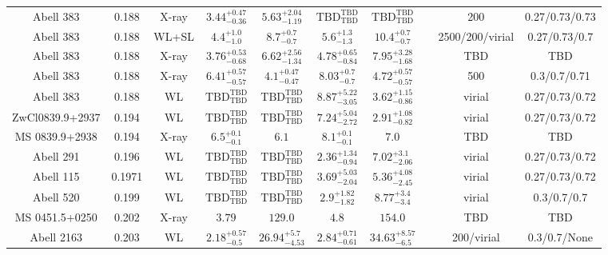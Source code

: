 \begin{table}
\begin{tabular}{cccccccccc}
Abell 383 & 0.188 & X-ray & ${3.44}^{+0.47}_{-0.36}$ & ${5.63}^{+2.04}_{-1.19}$ & ${\mathrm{TBD}}^{\mathrm{TBD}}_{\mathrm{TBD}}$ & ${\mathrm{TBD}}^{\mathrm{TBD}}_{\mathrm{TBD}}$ & \citet{BA14.1} & 200 & 0.27/0.73/0.73 \\
Abell 383 & 0.188 & WL+SL & ${4.4}^{+1.0}_{-1.0}$ & ${8.7}^{+0.7}_{-0.7}$ & ${5.6}^{+1.3}_{-1.3}$ & ${10.4}^{+0.7}_{-0.7}$ & \citet{ME14.1} & 2500/200/virial & 0.27/0.73/0.7 \\
Abell 383 & 0.188 & X-ray & ${3.76}^{+0.53}_{-0.68}$ & ${6.62}^{+2.56}_{-1.34}$ & ${4.78}^{+0.65}_{-0.84}$ & ${7.95}^{+3.28}_{-1.68}$ & \citet{SC06.1} & TBD & TBD \\
Abell 383 & 0.188 & X-ray & ${6.41}^{+0.57}_{-0.57}$ & ${4.1}^{+0.47}_{-0.47}$ & ${8.03}^{+0.7}_{-0.7}$ & ${4.72}^{+0.57}_{-0.57}$ & \citet{VI05.1} & 500 & 0.3/0.7/0.71 \\
Abell 383 & 0.188 & WL & ${\mathrm{TBD}}^{\mathrm{TBD}}_{\mathrm{TBD}}$ & ${\mathrm{TBD}}^{\mathrm{TBD}}_{\mathrm{TBD}}$ & ${8.87}^{+5.22}_{-3.05}$ & ${3.62}^{+1.15}_{-0.86}$ & \citet{OK10.1} & virial & 0.27/0.73/0.72 \\
ZwCl0839.9+2937 & 0.194 & WL & ${\mathrm{TBD}}^{\mathrm{TBD}}_{\mathrm{TBD}}$ & ${\mathrm{TBD}}^{\mathrm{TBD}}_{\mathrm{TBD}}$ & ${7.24}^{+5.04}_{-2.72}$ & ${2.91}^{+1.08}_{-0.82}$ & \citet{OK10.1} & virial & 0.27/0.73/0.72 \\
MS 0839.9+2938 & 0.194 & X-ray & ${6.5}^{+0.1}_{-0.1}$ & ${6.1}^{}_{}$ & ${8.1}^{+0.1}_{-0.1}$ & ${7.0}^{}_{}$ & \citet{WA05.1} & TBD & TBD \\
Abell 291 & 0.196 & WL & ${\mathrm{TBD}}^{\mathrm{TBD}}_{\mathrm{TBD}}$ & ${\mathrm{TBD}}^{\mathrm{TBD}}_{\mathrm{TBD}}$ & ${2.36}^{+1.34}_{-0.94}$ & ${7.02}^{+3.1}_{-2.06}$ & \citet{OK10.1} & virial & 0.27/0.73/0.72 \\
Abell 115 & 0.1971 & WL & ${\mathrm{TBD}}^{\mathrm{TBD}}_{\mathrm{TBD}}$ & ${\mathrm{TBD}}^{\mathrm{TBD}}_{\mathrm{TBD}}$ & ${3.69}^{+5.03}_{-2.04}$ & ${5.36}^{+4.08}_{-2.45}$ & \citet{OK10.1} & virial & 0.27/0.73/0.72 \\
Abell 520 & 0.199 & WL & ${\mathrm{TBD}}^{\mathrm{TBD}}_{\mathrm{TBD}}$ & ${\mathrm{TBD}}^{\mathrm{TBD}}_{\mathrm{TBD}}$ & ${2.9}^{+1.82}_{-1.82}$ & ${8.77}^{+3.4}_{-3.4}$ & \citet{OK08.1} & virial & 0.3/0.7/0.7 \\
MS 0451.5+0250 & 0.202 & X-ray & ${3.79}^{}_{}$ & ${129.0}^{}_{}$ & ${4.8}^{}_{}$ & ${154.0}^{}_{}$ & \citet{MO99.1} & TBD & TBD \\
Abell 2163 & 0.203 & WL & ${2.18}^{+0.57}_{-0.5}$ & ${26.94}^{+5.7}_{-4.53}$ & ${2.84}^{+0.71}_{-0.61}$ & ${34.63}^{+8.57}_{-6.5}$ & \citet{OK11.1} & 200/virial & 0.3/0.7/None \\

\end{tabular}
\end{table}
